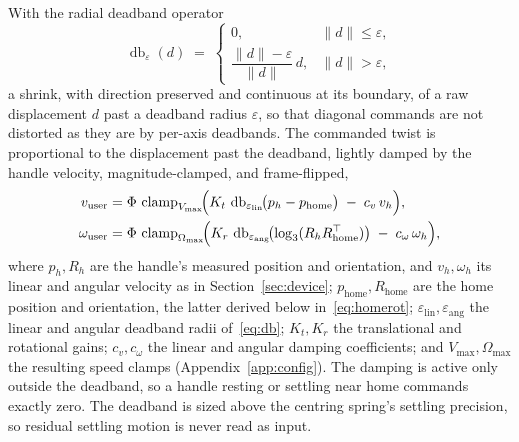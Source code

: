 With the radial deadband operator
\begin{equation}
\operatorname{db}_{\varepsilon}(d) \;=\;
\begin{cases}
0, & \|d\| \le \varepsilon,\\[2pt]
\dfrac{\|d\|-\varepsilon}{\|d\|}\, d, & \|d\| > \varepsilon,
\end{cases}
\label{eq:db}
\end{equation}
a shrink, with direction preserved and continuous at its boundary, of a raw displacement $d$ past a deadband radius $\varepsilon$, so that diagonal commands are not distorted as they are by per-axis deadbands. The commanded twist is proportional to the displacement past the deadband, lightly damped by the handle velocity, magnitude-clamped, and frame-flipped,
\begin{equation}
\begin{aligned}
v_{\text{user}} &= \Phi\,\operatorname{clamp}_{V_{\max}}\!\Bigl(K_t\,\operatorname{db}_{\varepsilon_{\text{lin}}}\!\bigl(p_h - p_{\text{home}}\bigr) \;-\; c_v\, v_h\Bigr),\\
\omega_{\text{user}} &= \Phi\,\operatorname{clamp}_{\Omega_{\max}}\!\Bigl(K_r\,\operatorname{db}_{\varepsilon_{\text{ang}}}\!\bigl(\log_3(R_h R_{\text{home}}^{\top})\bigr) \;-\; c_\omega\, \omega_h\Bigr),
\end{aligned}
\label{eq:jtwist}
\end{equation}
where $p_h, R_h$ are the handle's measured position and orientation, and $v_h, \omega_h$ its linear and angular velocity as in Section~\ref{sec:device}; $p_{\text{home}}, R_{\text{home}}$ are the home position and orientation, the latter derived below in~\eqref{eq:homerot}; $\varepsilon_{\text{lin}}, \varepsilon_{\text{ang}}$ the linear and angular deadband radii of~\eqref{eq:db}; $K_t, K_r$ the translational and rotational gains; $c_v, c_\omega$ the linear and angular damping coefficients; and $V_{\max}, \Omega_{\max}$ the resulting speed clamps (Appendix~\ref{app:config}). The damping is active only outside the deadband, so a handle resting or settling near home commands exactly zero. The deadband is sized above the centring spring's settling precision, so residual settling motion is never read as input.


